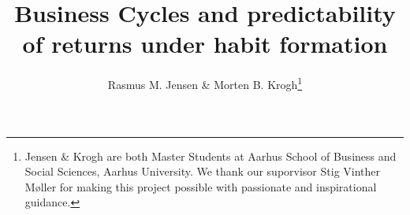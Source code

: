 

\usepackage{booktabs}



\onehalfspacing      %

\author{Rasmus M. Jensen \& Morten B. Krogh\thanks{\rm Jensen \& Krogh are both Master Students at Aarhus School of Business and Social Sciences, Aarhus University. We thank our suporvisor Stig Vinther Møller for making this project possible with passionate and inspirational guidance.}}

\title{\Large \bf Business Cycles and predictability of returns under habit formation}

\date{}              %


\maketitle
\thispagestyle{empty}



\clearpage


% 




\clearpage

\begin{doublespacing}   %


\end{doublespacing}



\clearpage

\renewcommand{\enotesize}{\normalsize}


\appendix



\clearpage


